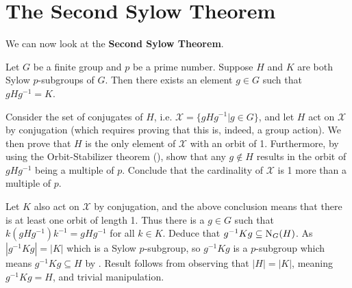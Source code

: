 \section{The Second Sylow Theorem}
We can now look at the \textbf{Second Sylow Theorem}.
\begin{theorem}[Sylow II]\label{thrm-sylow-2}
    Let $G$ be a finite group and $p$ be a prime number. Suppose $H$ and $K$ are both Sylow $p$-subgroups of $G$. Then there exists an element $g \in G$ such that $gHg^{-1} = K$.
\end{theorem}
\begin{proofsketch}
    Consider the set of conjugates of $H$, i.e. $\mathcal{X} = \{gHg^{-1} \vert g \in G\}$, and let $H$ act on $\mathcal{X}$ by conjugation (which requires proving that this is, indeed, a group action). We then prove that $H$ is the only element of $\mathcal{X}$ with an orbit of 1. Furthermore, by using the Orbit-Stabilizer theorem (), show that any $g \notin H$ results in the orbit of $gHg^{-1}$ being a multiple of $p$. Conclude that the cardinality of $\mathcal{X}$ is 1 more than a multiple of $p$.

    Let $K$ also act on $\mathcal{X}$ by conjugation, and the above conclusion means that there is at least one orbit of length 1. Thus there is a $g \in G$ such that $k(gHg^{-1})k^{-1} = gHg^{-1}$ for all $k \in K$. Deduce that $g^{-1}Kg \subseteq \mathrm{N}_{G}(H)$. As $|g^{-1}Kg| = |K|$ which is a Sylow $p$-subgroup, so $g^{-1}Kg$ is a $p$-subgroup which means $g^{-1}Kg \subseteq H$ by . Result follows from observing that $|H| = |K|$, meaning $g^{-1}Kg = H$, and trivial manipulation.
\end{proofsketch}

